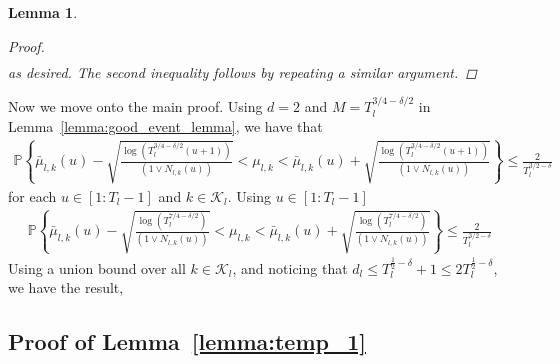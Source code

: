 \documentclass[12pt,draftcls, onecolumn]{IEEEtran}
\newtheorem{lemma}{Lemma}
\begin{document}
{\begin{lemma}
\begin{proof}
\begin{align}
     \end{align}
     as desired. The second inequality follows by repeating a similar argument.
    \end{proof}
\end{lemma}
Now we move onto the main proof. Using $d = 2$ and $M = T_l^{3/4-\delta/2}$ in Lemma~\ref{lemma:good_event_lemma}, we have that
\begin{align}
     \mathbb{P}\left\{ \bar{\mu}_{l,k}(u)-\sqrt{\frac{\log(T_l^{3/4-\delta/2}(u+1))}{(1 \vee N_{l,k}(u))}} < \mu_{l,k} < \bar{\mu}_{l,k}(u)+\sqrt{\frac{\log(T_l^{3/4-\delta/2}(u+1))}{(1 \vee N_{l,k}(u))}}\right\} \leq \frac{2}{T_l^{3/2-\delta}} \nonumber
\end{align}
for each $u \in [1:T_l-1]$ and $k \in \mathcal{K}_l$. Using $u \in [1:T_l-1]$
\begin{align}
     \mathbb{P}\left\{ \bar{\mu}_{l,k}(u)-\sqrt{\frac{\log(T_l^{7/4-\delta/2})}{(1 \vee N_{l,k}(u))}} < \mu_{l,k} < \bar{\mu}_{l,k}(u)+\sqrt{\frac{\log(T_l^{7/4-\delta/2})}{(1 \vee N_{l,k}(u))}}\right\} \leq \frac{2}{T_l^{3/2-\delta}}  \nonumber
\end{align}
Using a union bound over all $k \in \mathcal{K}_l$, and noticing that $d_l \leq T_l^{\frac{1}{2}-\delta}+1 \leq 2T_l^{\frac{1}{2}-\delta}$, we have the result,
\subsection{Proof of Lemma~\ref{lemma:temp_1}}\label{app:temp_1}

}
\end{document}
